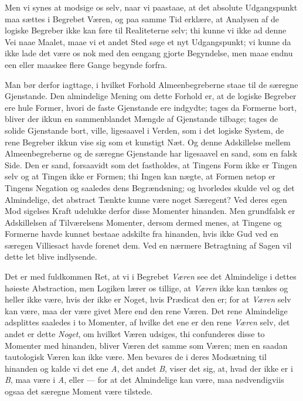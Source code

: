 \documentclass[12pt]{book}
\newcommand{\opage}[1]{\marginnote{\footnotesize\textit{[#1]}}}
\begin{document}
Men vi synes at modsige os selv, naar vi paastaae, at det absolute
Udgangspunkt maa sættes i Begrebet Væren, og paa samme Tid erklære, at
Analysen af de logiske Begreber ikke kan føre til Realiteterne selv; thi kunne
vi ikke ad denne Vei naae Maalet, maae vi et andet Sted søge et nyt
Udgangspunkt; vi kunne da ikke lade det være os nok med den eengang gjorte
Begyndelse, men maae endnu een eller maaskee flere Gange begynde forfra.

Man bør derfor iagttage, i hvilket Forhold Almeenbegreberne staae til de
særegne Gjenstande. Den almindelige Mening om dette Forhold er, at de logiske
Begreber ere hule Former, hvori de faste Gjenstande ere indgydte; tages da
Formerne bort, bliver der ikkun en sammenblandet Mængde af Gjenstande tilbage;
tages de solide Gjenstande bort, ville, ligesaavel i Verden, som i det logiske
System, de rene Begreber ikkun vise sig som et kunstigt Næt. Og denne
Adskillelse mellem Almeenbegreberne og de særegne Gjenstande har ligesaavel en
sand, som en falsk Side. Den er sand, forsaavidt som det fastholdes, at
Tingens Form ikke er Tingen selv og at Tingen ikke er Formen; thi Ingen kan
nægte, at Formen netop er Tingens Negation og saaledes dens Begrændsning; og
hvorledes skulde vel og det Almindelige, det abstract Tænkte kunne være noget
Særegent? Ved deres egen Mod\-%
\opage{9}sigelses Kraft udelukke derfor disse Momenter hinanden. Men grundfalsk er
Adskillelsen af Tilværelsens Momenter, dersom dermed menes, at Tingene og
Formerne havde kunnet bestaae adskilte fra hinanden, hvis ikke Gud ved en
særegen Villiesact havde forenet dem. Ved en nærmere Betragtning af Sagen vil
dette let blive indlysende.

Det er med fuldkommen Ret, at vi i Begrebet \emph{Væren} see det Almindelige i
dettes høieste Abstraction, men Logiken lærer os tillige, at \emph{Væren} ikke
kan tænkes og heller ikke være, hvis der ikke er Noget, hvis Prædicat den er;
for at \emph{Væren} selv kan være, maa der være givet Mere end den rene Væren.
Det rene Almindelige adsplittes saaledes i to Momenter, af hvilke det ene er
den rene \emph{Væren} selv, det andet er dette \emph{Noget}, om hvilket Væren
udsiges, thi confunderes disse to Momenter med hinanden, bliver Væren det
samme som Væren; men en saadan tautologisk Væren kan ikke være. Men bevares de
i deres Modsætning til hinanden og kalde vi det ene \textit{A}, det andet
\textit{B}, viser det sig, at, hvad der ikke er i \textit{B}, maa være i
\textit{A}, eller --- for at det Almindelige kan være, maa nødvendigviis ogsaa
det særegne Moment være tilstede.
\end{document}
